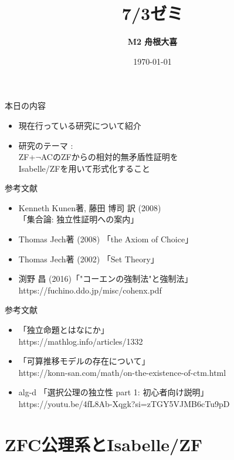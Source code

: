\documentclass[17pt,aspectratio=169,xcolor=dvipsnames,table,dvipdfmx]{beamer}
\title{7/3ゼミ}
\author{\textbf{M2 舟根大喜}}
\date{\today}
\theoremstyle{definition}
\begin{document}
\maketitle

\begin{frame} {本日の内容}
    \begin{itemize}
        \item 現在行っている研究について紹介
        \item 研究のテーマ : \\ZF+$\neg$ACのZFからの相対的無矛盾性証明を\\Isabelle/ZFを用いて形式化すること
    \end{itemize}
\end{frame}

\begin{frame} {参考文献}
    \begin{itemize}
        \item Kenneth Kunen著, 藤田 博司 訳 (2008) \\「集合論: 独立性証明への案内」
        \item Thomas Jech著 (2008) 「the Axiom of Choice」
        \item Thomas Jech著 (2002) 「Set Theory」
        \item 渕野 昌 (2016)「"コーエンの強制法"と強制法」 \\
              {\small https://fuchino.ddo.jp/misc/cohenx.pdf }
    \end{itemize}
\end{frame} 

\begin{frame} {参考文献}
    \begin{itemize}
        \item 「独立命題とはなにか」\\ {\small https://mathlog.info/articles/1332 }
        \item 「可算推移モデルの存在について」 \\ {\small https://konn-san.com/math/on-the-existence-of-ctm.html}
        \item alg-d 「選択公理の独立性 part 1: 初心者向け説明」 \\
              {\small https://youtu.be/4fL8Ab-Xqgk?si=zTGY5VJMB6cTu9pD}
    \end{itemize}
\end{frame}

\frame{\tableofcontents[hideallsubsections]}

\section{ZFC公理系とIsabelle/ZF}
\end{document}
